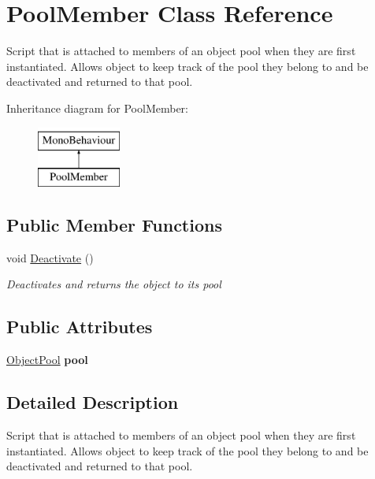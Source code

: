 \hypertarget{class_pool_member}{}\section{Pool\+Member Class Reference}
\label{class_pool_member}


Script that is attached to members of an object pool when they are first instantiated. Allows object to keep track of the pool they belong to and be deactivated and returned to that pool.  


Inheritance diagram for Pool\+Member\+:\begin{figure}[H]
\begin{center}
\leavevmode
\includegraphics[height=2.000000cm]{class_pool_member}
\end{center}
\end{figure}
\subsection*{Public Member Functions}
\begin{DoxyCompactItemize}
\item 
void \hyperlink{class_pool_member_a6f883eaed133e4b288a3847aea3ff33a}{Deactivate} ()
\begin{DoxyCompactList}\small\item\em Deactivates and returns the object to its pool \end{DoxyCompactList}\end{DoxyCompactItemize}
\subsection*{Public Attributes}
\begin{DoxyCompactItemize}
\item 
\hyperlink{class_object_pool}{Object\+Pool} {\bfseries pool}\hypertarget{class_pool_member_ae603b4d8b40af37e228cba441d1f1795}{}\label{class_pool_member_ae603b4d8b40af37e228cba441d1f1795}

\end{DoxyCompactItemize}


\subsection{Detailed Description}
Script that is attached to members of an object pool when they are first instantiated. Allows object to keep track of the pool they belong to and be deactivated and returned to that pool. 



